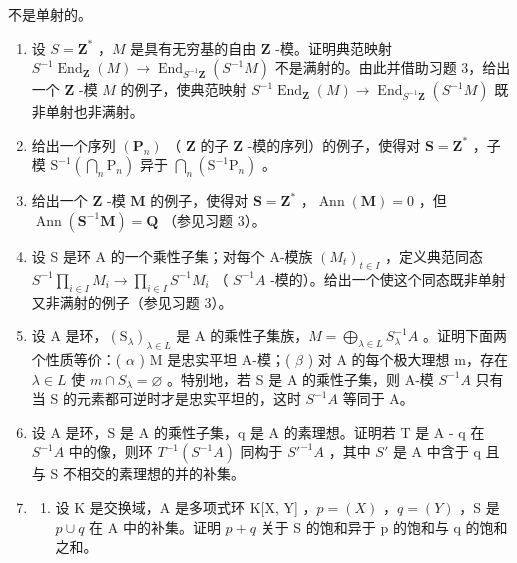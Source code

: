不是单射的。

\begin{enumerate}
\def\labelenumi{\arabic{enumi}.}
\setcounter{enumi}{3}
\item
  设 \(S = \mathbf{Z}^*\) ，\(M\) 是具有无穷基的自由 \(\mathbf{Z}\) -模。证明典范映射 \(S^{-1}\operatorname{End}_{\mathbf{Z}}(M) \to \operatorname{End}_{S^{-1}\mathbf{Z}}(S^{-1}M)\) 不是满射的。由此并借助习题 3，给出一个 \(\mathbf{Z}\) -模 \(M\) 的例子，使典范映射 \(S^{-1}\operatorname{End}_{\mathbf{Z}}(M) \to \operatorname{End}_{S^{-1}\mathbf{Z}}(S^{-1}M)\) 既非单射也非满射。
\item
  给出一个序列 \((\mathbf{P}_n)\) （ \(\mathbf{Z}\) 的子 \(\mathbf{Z}\) -模的序列）的例子，使得对 \(\mathbf{S} = \mathbf{Z}^*\) ，子模 \(\mathrm{S}^{-1}\left(\bigcap_{n} \mathrm{P}_{n}\right)\) 异于 \(\bigcap_{n} (\mathrm{S}^{-1}\mathrm{P}_{n})\) 。
\item
  给出一个 \(\mathbf{Z}\) -模 \(\mathbf{M}\) 的例子，使得对 \(\mathbf{S} = \mathbf{Z}^*\) ，\(\operatorname{Ann}(\mathbf{M}) = 0\) ，但 \(\operatorname{Ann}(\mathbf{S}^{-1}\mathbf{M}) = \mathbf{Q}\) （参见习题 3）。
\item
  设 S 是环 A 的一个乘性子集；对每个 A-模族 \((M_{t})_{t\in I}\) ，定义典范同态 \(S^{-1}\prod_{i\in I}M_{i}\to\prod_{i\in I}S^{-1}M_{i}\) （ \(S^{-1}A\) -模的）。给出一个使这个同态既非单射又非满射的例子（参见习题 3）。
\item
  设 A 是环，\((\mathrm{S}_{\lambda})_{\lambda \in L}\) 是 A 的乘性子集族，\(M = \bigoplus_{\lambda \in L} S_{\lambda}^{-1}A\) 。证明下面两个性质等价：( \(\alpha\) ) M 是忠实平坦 A-模；( \(\beta\) ) 对 A 的每个极大理想 m，存在 \(\lambda \in L\) 使 \(m \cap S_{\lambda} = \varnothing\) 。特别地，若 S 是 A 的乘性子集，则 A-模 \(S^{-1}A\) 只有当 S 的元素都可逆时才是忠实平坦的，这时 \(S^{-1}A\) 等同于 A。
\item
  设 A 是环，S 是 A 的乘性子集，q 是 A 的素理想。证明若 T 是 A - q 在 \(S^{-1}A\) 中的像，则环 \(T^{-1}(S^{-1}A)\) 同构于 \(S'^{-1}A\) ，其中 \(S'\) 是 A 中含于 q 且与 S 不相交的素理想的并的补集。
\item
  \begin{enumerate}
  \def\labelenumii{(\alph{enumii})}
  \tightlist
  \item
    设 K 是交换域，A 是多项式环 K{[}X, Y{]} ，\(p = (X)\) ，\(q = (Y)\) ，S 是 \(p \cup q\) 在 A 中的补集。证明 \(p + q\) 关于 S 的饱和异于 p 的饱和与 q 的饱和之和。
  \end{enumerate}
\end{enumerate}

